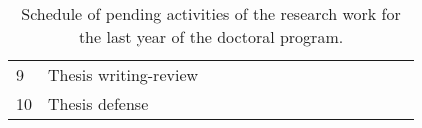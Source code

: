 \documentclass[10pt]{article}
\begin{document}
\begin{table}
{\begin{tabular}{lllllllllllllll}
\rowcolor{colorA}
9  & \rule{0pt}{2ex}Thesis writing-review                                                                                                       &                           &                           &                           &                           &                           &                           &                           & \cellcolor{colorCell} & \cellcolor{colorCell} & \cellcolor{colorCell} & \cellcolor{colorCell} & \cellcolor{colorCell} &                           \\

\rowcolor{colorB}
10 & Thesis defense                                                                                                              &                           &                           &                           &                           &                           &                           &                           &                           &                           &                           &                           &                           & \cellcolor{colorCell} \\
\bottomrule
\end{tabular}
\hspace*{-1cm}
}
\caption{Schedule of pending activities of the research work for the last year of the doctoral program.}
\label{tab:schedule}
\end{table}
\end{document}
